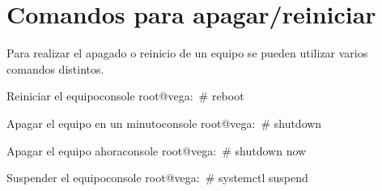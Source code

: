 \section{Comandos para apagar/reiniciar}

Para realizar el apagado o reinicio de un equipo se pueden utilizar varios comandos distintos.

\begin{mycode}{Reiniciar el equipo}{console}{}
root@vega:~# reboot
\end{mycode}

\begin{mycode}{Apagar el equipo en un minuto}{console}{}
root@vega:~# shutdown
\end{mycode}

\begin{mycode}{Apagar el equipo ahora}{console}{}
root@vega:~# shutdown now
\end{mycode}

\begin{mycode}{Suspender el equipo}{console}{}
root@vega:~# systemctl suspend
\end{mycode}